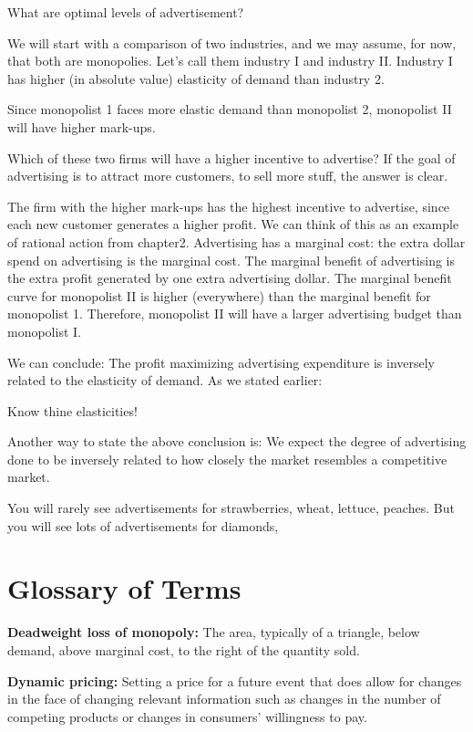 \documentclass[
]{book}
\begin{document}
What are optimal levels of advertisement?

We will start with a comparison of two industries, and we may assume, for now, that both are monopolies. Let's call them industry I and industry II. Industry I has higher (in absolute value) elasticity of demand than industry 2.

Since monopolist 1 faces more elastic demand than monopolist 2, monopolist II will have higher mark-ups.

Which of these two firms will have a higher incentive to advertise?
If the goal of advertising is to attract more customers, to sell more stuff, the answer is clear.

The firm with the higher mark-ups has the highest incentive to advertise, since each new customer generates a higher profit. We can think of this as an example of rational action from chapter2. Advertising has a marginal cost: the extra dollar spend on advertising is the marginal cost. The marginal benefit of advertising is the extra profit generated by one extra advertising dollar. The marginal benefit curve for monopolist II is higher (everywhere) than the marginal benefit for monopolist 1. Therefore, monopolist II will have a larger advertising budget than monopolist I.

We can conclude:
The profit maximizing advertising expenditure is inversely related to the elasticity of demand.
As we stated earlier:

\begin{center}
Know thine elasticities!

\end{center}

Another way to state the above conclusion is: We expect the degree of advertising done to be inversely related to how closely the market resembles a competitive market.

You will rarely see advertisements for strawberries, wheat, lettuce, peaches. But you will see lots of advertisements for diamonds,

\hypertarget{glossary-of-terms-6}{%
\section{Glossary of Terms}\label{glossary-of-terms-6}}

\textbf{Deadweight loss of monopoly:} The area, typically of a triangle, below demand, above marginal cost, to the right of the quantity sold.

\textbf{Dynamic pricing:} Setting a price for a future event that does allow for changes in the face of changing relevant information such as changes in the number of competing products or changes in consumers' willingness to pay.
\end{document}
